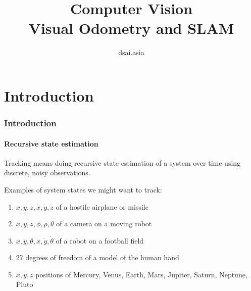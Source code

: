 \documentclass[aspectratio=169]{beamer}
\title[Computer Vision]{Computer Vision\\Visual Odometry and SLAM}
\author{dsai.asia}
\institute[]{Asia Data Science and Artificial Intelligence Master's Program}
\date{}
\begin{document}


\frame{\titlepage}

%






\section{Introduction}

\begin{frame}
\frametitle{Introduction}
\framesubtitle{Recursive state estimation}

\alert{Tracking} means doing recursive \alert{state estimation} of
a system over time using \alert{discrete, noisy observations}.

\begin{block}{Examples of system states we might want to track:}
\begin{enumerate}
\item $x,y,z,\dot{x},\dot{y},\dot{z}$ of a hostile airplane or
  missile
\item $x,y,z,\phi,\rho,\theta$ of a camera on a moving robot
\item $x,y,\theta,\dot{x},\dot{y},\dot{\theta}$ of a robot on a
  football field
\item 27 degrees of freedom of a model of the human hand
\item $x,y,z$ positions of Mercury, Venus, Earth, Mars, Jupiter, Saturn,
    Neptune, Pluto
\end{enumerate}
\end{block}

\end{frame}
\end{document}
